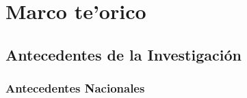 
\chapter{Marco te'orico}

\section{Antecedentes de la Investigaci\'on}

\subsection{Antecedentes Nacionales}

